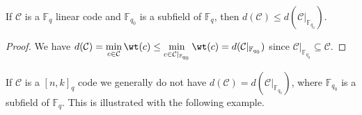 \begin{proposition}\label{prop:mininum_distance_of_subfield_subcode}
  If $\mathcal{C}$ is a $\mathbb{F}_q$ linear code and $\mathbb{F}_{q_0}$ is a subfield of $\mathbb{F}_q$, then $d(\mathcal{C}) \leq d(\mathcal{C} \vert_{\mathbb{F}_{q_0}})$.
\end{proposition}
\begin{proof}
  We have $\displaystyle d(\mathcal{C}) = \min_{c \in \mathcal{C}} \wt(c) \leq \min_{c \in \mathcal{C} \vert_{\mathbb{F}_{q_0}}} \wt(c) = d(\mathcal{C} \vert_{\mathbb{F}_{q_0}})$ since $\mathcal{C} \vert_{\mathbb{F}_{q_0}} \subseteq \mathcal{C}$.
\end{proof}

If $\mathcal{C}$ is a $[n, k]_q$ code we generally do not have $d(\mathcal{C}) = d(\mathcal{C} \vert_{\mathbb{F}_{q_0}})$, where $\mathbb{F}_{q_0}$ is a subfield of $\mathbb{F}_q$. This is illustrated with the following example.
